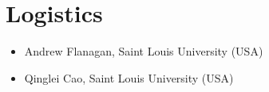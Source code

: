 \section*{Logistics}
\begin{itemize}
\item Andrew Flanagan, Saint Louis University (USA) 
\item Qinglei Cao, Saint Louis University (USA)
\end{itemize}

